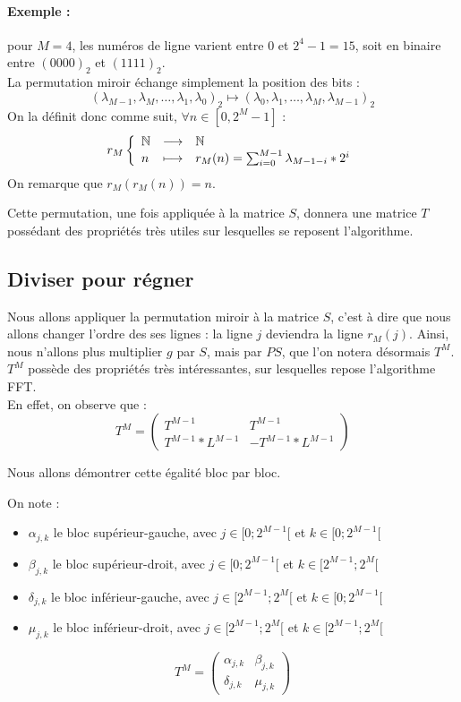 \documentclass{report}
\begin{document}
		\paragraph{Exemple : } pour $M = 4$, les numéros de ligne varient entre $0$ et $2^4 - 1 = 15$, soit en binaire entre $(0000)_2$ et $(1111)_2$.\\

		La permutation miroir échange simplement la position des bits :
		\[
			(\lambda_{M-1}, \lambda_M, \ldots, \lambda_1, \lambda_0)_2 \longmapsto (\lambda_0, \lambda_1, \ldots, \lambda_M, \lambda_{M-1})_2
		\]
		On la définit donc comme suit, $\forall n \in [0, 2^M - 1]$ :
		\begin{displaymath}
			r_M 
			\left \{
			\begin{array}{l l l}
				\mathbb{N} 		&\longrightarrow& 		\mathbb{N} \\
				n				&\longmapsto&			r_M(n) = \sum_{i=0}^{M-1} \lambda_{M-1-i} * 2^i
			\end{array}
			\right .
		\end{displaymath}
		On remarque que $r_M(r_M(n)) = n$.

		Cette permutation, une fois appliquée à la matrice $S$, donnera une matrice $T$ possédant des propriétés très utiles sur lesquelles se reposent l'algorithme.

		\subsection{Diviser pour régner}
		Nous allons appliquer la permutation miroir à la matrice $S$, c'est à dire que nous allons changer l'ordre des ses lignes : la ligne $j$ deviendra la ligne $r_M(j)$.
		Ainsi, nous n'allons plus multiplier $g$ par $S$, mais par $PS$, que l'on notera désormais $T^M$. $T^M$ possède des propriétés très intéressantes, sur lesquelles repose l'algorithme FFT.\\
		En effet, on observe que :
		\[
			T^M = 	\begin{pmatrix}
						T^{M-1} & T^{M-1}\\
						T^{M-1}*L^{M-1} & -T^{M-1}*L^{M-1}
					\end{pmatrix}
		\]	
		
		Nous allons démontrer cette égalité bloc par bloc.
		
		On note :
		\begin{itemize}
			\item $\alpha_{j,k}$ le bloc supérieur-gauche, avec $j\in[0; 2^{M-1}[$ et $k\in[0; 2^{M-1}[$
			\item $\beta_{j,k}$ le bloc supérieur-droit, avec $j\in[0; 2^{M-1}[$ et $k\in[2^{M-1}; 2^M[$
			\item $\delta_{j,k}$ le bloc inférieur-gauche, avec $j\in[2^{M-1}; 2^M[$ et $k\in[0; 2^{M-1}[$
			\item $\mu_{j,k}$ le bloc inférieur-droit, avec $j\in[2^{M-1}; 2^M[$ et $k\in[2^{M-1}; 2^M[$
		\end{itemize}
		\[
			T^M = 	\begin{pmatrix}
						\alpha_{j,k} & \beta_{j,k}\\
						\delta_{j,k} & \mu_{j,k}
					\end{pmatrix}
		\]
\end{document}
